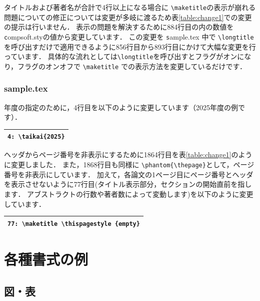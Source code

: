\documentclass[T,J]{fose} %
\begin{document}
タイトルおよび著者名が合計で4行以上になる場合に \verb|\maketitle|の表示が崩れる問題についての修正については変更が多岐に渡るため表\ref{table:change1}での変更の提示は行いません．
表示の問題を解決するために884行目の内の数値を {\texttt compsoft.sty}の値から変更しています．
この変更を {\texttt sample.tex} 中で \verb|\longtitle| を呼び出すだけで適用できるように856行目から893行目にかけて大幅な変更を行っています．
具体的な流れとしては\verb|\longtitle|を呼び出すとフラグがオンになり，フラグのオンオフで \verb|\maketitle| での表示方法を変更しているだけです．

\subsubsection*{sample.tex}
年度の指定のために，4行目を以下のように変更しています（2025年度の例です）．

\begin{tabularx}{23zw}{|X|}
	\hline
	\verb|4: \taikai{2025}|
	\\
	\hline
\end{tabularx}

ヘッダからページ番号を非表示にするために1864行目を表\ref{table:change1}のように変更しました．
また，1868行目も同様に \verb|\phantom{\thepage}|として，ページ番号を非表示にしています．
加えて，各論文の1ページ目にページ番号とヘッダを表示させないように77行目(タイトル表示部分，セクションの開始直前を指します．
アブストラクトの行数や著者数によって変動します)を以下のように変更しています．\\

\begin{tabularx}{23zw}{|X|}
	\hline
	\verb|77: \maketitle \thispagestyle {empty}|
	\\
	\hline
\end{tabularx}


\section{各種書式の例}

\subsection{図・表}
\end{document}

